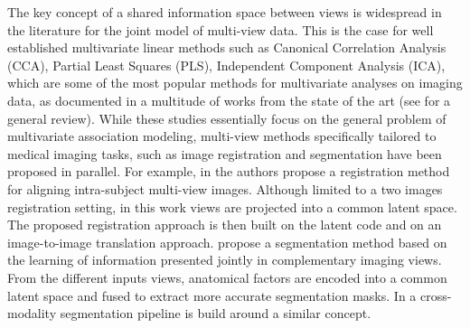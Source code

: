 The key concept of a shared information space between views is widespread in the literature for the joint model of multi-view data.
%
This is the case for well established multivariate linear methods such as
Canonical Correlation Analysis (CCA),
Partial Least Squares (PLS),
Independent Component Analysis (ICA),
which are some of the most popular methods for multivariate analyses on imaging data, as documented in a multitude of works from the state of the art (see \cite{Liu2014} for a general review).
%
While these studies essentially focus on the general problem of multivariate association modeling, multi-view methods specifically tailored to medical imaging tasks, such as image registration and segmentation have been proposed in parallel.
For example, in \cite{Qin2019} the authors propose
a registration method for aligning intra-subject multi-view images.
Although limited to a two images registration setting,
in this work views are projected into a common latent space.
The proposed registration approach is then built on the latent code and on an image-to-image translation approach.
%
%
\cite{Chartsias2021} propose a segmentation method based on the learning of information presented jointly in complementary imaging views.
From the different inputs views, anatomical factors are encoded into a common latent space and fused to extract more accurate segmentation masks.
%
%
In \cite{Yang2020} a cross-modality segmentation pipeline is build around a similar concept.
% 
